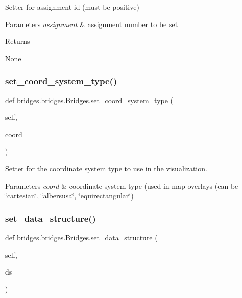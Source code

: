 Setter for assignment id (must be positive) 


\begin{DoxyParams}{Parameters}
{\em assignment} & assignment number to be set \\
\hline
\end{DoxyParams}
\begin{DoxyReturn}{Returns}


None 
\end{DoxyReturn}
\mbox{\label{classbridges_1_1bridges_1_1_bridges_a6bc905490b1995234f88f47af9aa8a17}} 
\subsubsection{\texorpdfstring{set\_coord\_system\_type()}{set\_coord\_system\_type()}}
{\footnotesize\ttfamily def bridges.\+bridges.\+Bridges.\+set\+\_\+coord\+\_\+system\+\_\+type (\begin{DoxyParamCaption}\item[{}]{self,  }\item[{}]{coord }\end{DoxyParamCaption})}



Setter for the coordinate system type to use in the visualization. 


\begin{DoxyParams}{Parameters}
{\em coord} & coordinate system type (used in map overlays (can be \char`\"{}cartesian\char`\"{}, \char`\"{}albersusa\char`\"{}, \char`\"{}equirectangular\char`\"{}) \\
\hline
\end{DoxyParams}
\mbox{\label{classbridges_1_1bridges_1_1_bridges_a868f02fa66c87c1a1fc7bd6fbc799291}} 
\subsubsection{\texorpdfstring{set\_data\_structure()}{set\_data\_structure()}}
{\footnotesize\ttfamily def bridges.\+bridges.\+Bridges.\+set\+\_\+data\+\_\+structure (\begin{DoxyParamCaption}\item[{}]{self,  }\item[{}]{ds }\end{DoxyParamCaption})}

